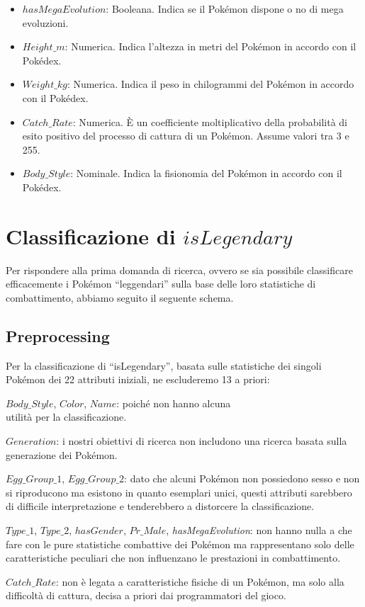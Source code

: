 \documentclass[fleqn,10pt]{SelfArx} %
\begin{document}
\begin{itemize}
\item $hasMegaEvolution$: Booleana. Indica se il Pokémon dispone o no di mega evoluzioni.
\item $Height\_m$: Numerica. Indica l'altezza in metri del Pokémon in accordo con il Pokédex.
\item $Weight\_kg$: Numerica. Indica il peso in chilogrammi del Pokémon in accordo con il Pokédex.
\item $Catch\_Rate$: Numerica. \`E un coefficiente moltiplicativo della probabilità di esito positivo del processo di cattura di un Pokémon. Assume valori tra 3 e 255.
\item $Body\_Style$: Nominale. Indica la fisionomia del Pokémon in accordo con il Pokédex.
\end{itemize}


\section{Classificazione di $isLegendary$}
Per rispondere alla prima domanda di ricerca, ovvero se sia possibile classificare efficacemente i Pokémon ``leggendari” sulla base delle loro statistiche di combattimento, abbiamo seguito il seguente schema.

\subsection{Preprocessing}
Per la classificazione di “isLegendary”, basata sulle statistiche dei singoli Pokémon dei 22 attributi iniziali, ne escluderemo 13 a priori: 

$Body\_Style$, $Color$, $Name$: poiché non hanno alcuna\\ utilità per la classificazione.

$Generation$: i nostri obiettivi di ricerca non includono una ricerca basata sulla generazione dei Pokémon.

$Egg\_Group\_1$, $Egg\_Group\_2$: dato che alcuni Pokémon non possiedono sesso e non si riproducono ma esistono in quanto esemplari unici, questi attributi sarebbero di difficile interpretazione e tenderebbero a distorcere la classificazione.

$Type\_1$, $Type\_2$, $hasGender$, $Pr\_Male$, \textit{hasMegaEvolution}: non hanno nulla a che fare con le pure statistiche combattive dei Pokémon ma rappresentano solo delle caratteristiche peculiari che non influenzano le prestazioni in combattimento.

$Catch\_Rate$: non è legata a caratteristiche fisiche di un Pokémon, ma solo alla difficoltà di cattura, decisa a priori dai programmatori del gioco.
\end{document}
